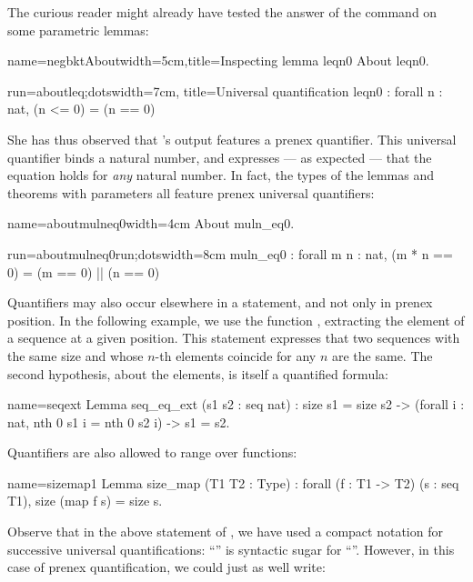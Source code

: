 The curious reader might already have tested the answer of the
 command on some parametric lemmas:

\begin{coq-left}{name=negbktAbout}{width=5cm,title=Inspecting lemma leqn0}
About leqn0.
\end{coq-left}
\begin{coqout-right}{run=aboutleq;dots}{width=7cm, title=Universal quantification}
leqn0 : forall n : nat, (n <= 0) = (n == 0)
\end{coqout-right}

She has thus observed that \Coq{}'s output features a prenex
 quantifier. This universal quantifier binds a natural number, and
expresses --- as expected --- that the equation holds for \emph{any}
natural number. In fact, the types of the lemmas and theorems with
parameters all feature prenex universal quantifiers:

\begin{coq-left}{name=aboutmulneq0}{width=4cm}
About muln_eq0.
$~$
\end{coq-left}
\begin{coqout-right}{run=aboutmulneq0run;dots}{width=8cm}
muln_eq0 : forall m n : nat,
  (m * n == 0) = (m == 0) || (n == 0)
\end{coqout-right}

Quantifiers may also occur elsewhere in a statement, and not only in
prenex position.  In the following example, we use the function
, extracting the element of a sequence at a given position.
This statement expresses that two
sequences with the same size and whose $n$-th elements coincide for any
$n$ are the same. The second hypothesis, about the elements, is
itself a quantified formula:

\begin{coq}{name=seqext}{}
Lemma seq_eq_ext (s1 s2 : seq nat) :
  size s1 = size s2 ->
  (forall i : nat, nth 0 s1 i = nth 0 s2 i) ->
  s1 = s2.
\end{coq}
Quantifiers are also allowed to range over functions:

\begin{coq}{name=sizemap1}{}
Lemma size_map (T1 T2 : Type) :
  forall (f : T1 -> T2) (s : seq T1), size (map f s) = size s.
\end{coq}
Observe that in the above statement of , we have used a
compact notation for successive universal quantifications:
``'' is syntactic sugar for
``''. However, in this case
of prenex quantification, we could just as well write:

